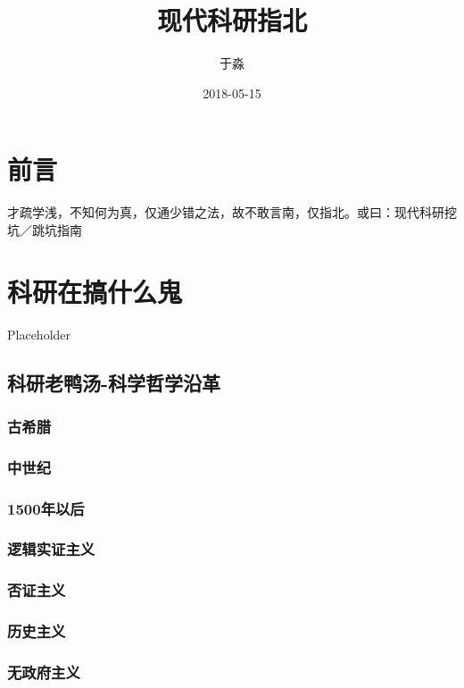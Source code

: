 \documentclass[]{book}
\title{现代科研指北}
\author{于淼}
\date{2018-05-15}
\begin{document}
\maketitle

{
\setcounter{tocdepth}{1}
\tableofcontents
}
\chapter{前言}

才疏学浅，不知何为真，仅通少错之法，故不敢言南，仅指北。或曰：现代科研挖坑／跳坑指南

\chapter{科研在搞什么鬼}\label{intro}

Placeholder

\section{科研老鸭汤-科学哲学沿革}\label{-}

\subsection{古希腊}

\subsection{中世纪}

\subsection{1500年以后}

\subsection{逻辑实证主义}

\subsection{否证主义}

\subsection{历史主义}

\subsection{无政府主义}
\end{document}
